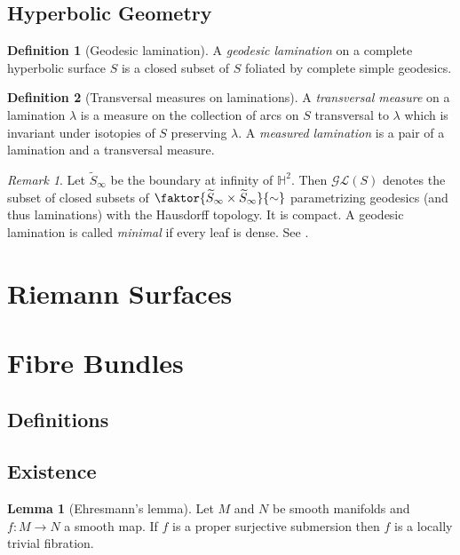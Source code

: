 \documentclass[a4paper]{article}
\newcommand{\HH}{\mathbb{H}}
\newcommand{\mcL}{\mathcal L}
\newcommand{\mcG}{\mathcal G}
\newcommand{\lra}{\longrightarrow}
\newcommand{\wt}[1]{\widetilde{#1}}
\theoremstyle{definition}
\newtheorem{lem}{Lemma}
\theoremstyle{definition}
\newtheorem{definition}{Definition}
\theoremstyle{remark}
\newtheorem{rmk}{Remark}
\theoremstyle{remark}
\theoremstyle{remark}
\begin{document}
\subsection{Hyperbolic Geometry}

\begin{definition}[Geodesic lamination]
  A \emph{geodesic lamination} on a complete hyperbolic surface $S$ is a closed subset of $S$ foliated by complete simple geodesics.  
\end{definition}

\begin{definition}[Transversal measures on laminations]
  A \emph{transversal measure} on a lamination $\lambda$ is a measure on the collection of arcs on $S$ transversal to $\lambda$ which  is invariant under isotopies of $S$ preserving $\lambda$. A \emph{measured lamination} is a pair of a lamination and a transversal measure.
\end{definition}

\begin{rmk}
  Let $\wt{S}_{\infty}$ be the boundary at infinity of $\HH^2$. Then $\mcG\mcL(S)$ denotes the subset of closed subsets of $\faktor{\wt{S}_{\infty}\times \wt{S}_{\infty}}{\sim}$ parametrizing geodesics (and thus laminations) with the Hausdorff topology. It is compact. A geodesic lamination is called \emph{minimal} if every leaf is dense. See \cite{Brock2014}.
\end{rmk}
\section{Riemann Surfaces}

\section{Fibre Bundles}

\subsection{Definitions}

\subsection{Existence}


\begin{lem}[Ehresmann's lemma]
  Let $M$ and $N$ be smooth manifolds and $f:M\lra N$ a smooth map. If $f$ is a proper surjective submersion then $f$ is a locally trivial fibration.
\end{lem}
\end{document}
